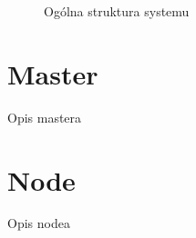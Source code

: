 \documentclass[paper=a4, fontsize=11pt]{scrartcl} %
\numberwithin{equation}{section} %
\numberwithin{figure}{section} %
\numberwithin{table}{section} %
\begin{document}
\begin{figure}[t]
	\begin{center}
		\caption{Ogólna struktura systemu}
	\end{center}
\end{figure}
\clearpage
\section{Master}
Opis mastera
\section{Node}
Opis nodea
\end{document}
